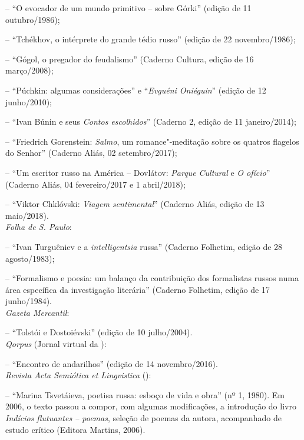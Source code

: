 \noindent{}-- ``O evocador de um mundo primitivo -- sobre Górki'' (edição de 11 outubro/1986);

\noindent{}-- ``Tchékhov, o intérprete do grande tédio russo'' (edição de 22 novembro/1986); 

\noindent{}-- ``Gógol, o pregador do feudalismo'' (Caderno Cultura, edição de 16 março/2008); 

\noindent{}-- ``Púchkin: algumas considerações'' e ``\emph{Evguéni Oniéguin}'' (edição de 12 junho/2010); 

\noindent{}-- ``Ivan Búnin e seus \emph{Contos escolhidos}'' (Caderno 2, edição de 11 janeiro/2014); 

\noindent{}-- ``Friedrich Gorenstein: \emph{Salmo}, um romance"-meditação sobre os quatros flagelos do Senhor'' (Caderno Aliás, 02 setembro/2017); 

\noindent{}-- ``Um escritor russo na América -- Dovlátov: \emph{Parque Cultural} e \emph{O ofício}'' (Caderno Aliás, 04 fevereiro/2017 e 1 abril/2018); 

\noindent{}-- ``Viktor Chklóvski: \emph{Viagem sentimental}'' (Caderno Aliás, edição de 13 maio/2018). \\

\noindent{}\emph{Folha de S. Paulo}:

\noindent{}-- ``Ivan Turguêniev e a \emph{intelligentsia} russa'' (Caderno Folhetim, edição de 28 agosto/1983);

\noindent{}-- ``Formalismo e poesia: um balanço da contribuição dos formalistas russos numa
área específica da investigação literária'' (Caderno Folhetim, edição de 17 junho/1984). \\

\noindent{}\emph{Gazeta Mercantil}:

\noindent{}-- ``Tolstói e Dostoiévski'' (edição de 10 julho/2004). \\

\noindent{}\emph{Qorpus} (Jornal virtual da ):

\noindent{}-- ``Encontro de andarilhos'' (edição de 14 novembro/2016). \\

\noindent{}\emph{Revista Acta Semiótica et Lingvistica} ():

\noindent{}-- ``Marina Tsvetáieva, poetisa russa: esboço de vida e obra'' (nº 1, 1980). Em 2006, o texto passou a compor, com algumas modificações, a introdução do livro \emph{Indícios flutuantes -- poemas}, seleção de poemas da autora, acompanhado de estudo crítico (Editora Martins, 2006). \\

